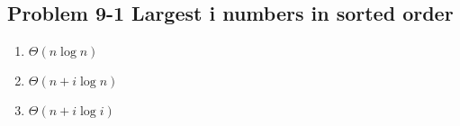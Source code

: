 \subsection*{Problem 9-1 Largest i numbers in sorted order}
\begin{enumerate}
	\item	$\Theta(n \log n)$
	\item	$\Theta(n + i \log n)$
	\item	$\Theta(n + i \log i)$
\end{enumerate}

